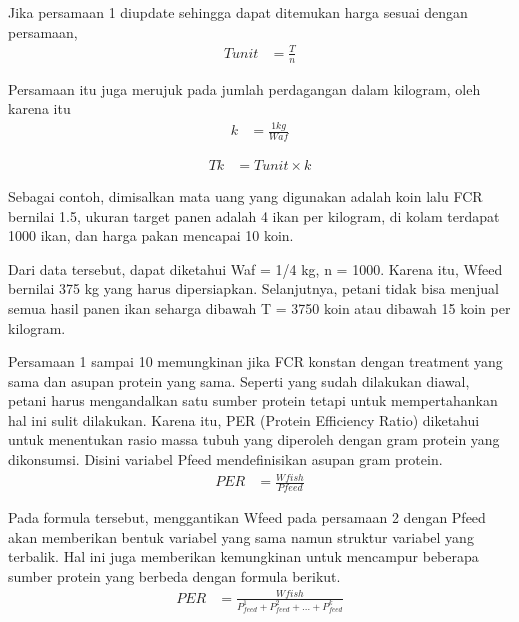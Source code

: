 Jika persamaan 1 diupdate sehingga dapat ditemukan harga sesuai dengan persamaan,
\begin{equation}
    \begin{split}
		Tunit
		&= \frac{T}{n}
    \end{split}
\end{equation}

Persamaan itu juga merujuk pada jumlah perdagangan dalam kilogram, oleh karena itu
\begin{equation}
    \begin{split}
		k
		&= \frac{1kg}{Waf}
    \end{split}
\end{equation}

\begin{equation}
    \begin{split}
		Tk
		&= Tunit \times k
    \end{split}
\end{equation}

Sebagai contoh, dimisalkan mata uang yang digunakan adalah koin lalu FCR bernilai 1.5, ukuran target panen adalah 4 ikan per kilogram, di kolam terdapat 1000 ikan, dan harga pakan mencapai 10 koin.

Dari data tersebut, dapat diketahui Waf = 1/4 kg, n = 1000. Karena itu, Wfeed bernilai 375 kg yang harus dipersiapkan. Selanjutnya, petani tidak bisa menjual semua hasil panen ikan seharga dibawah T = 3750 koin atau dibawah 15 koin per kilogram.

Persamaan 1 sampai 10 memungkinan jika FCR konstan dengan treatment yang sama dan asupan protein yang sama. Seperti yang sudah dilakukan diawal, petani harus mengandalkan satu sumber protein tetapi untuk mempertahankan hal ini sulit dilakukan. Karena itu, PER (Protein Efficiency Ratio) diketahui untuk menentukan rasio massa tubuh yang diperoleh dengan gram protein yang dikonsumsi. Disini variabel Pfeed mendefinisikan asupan gram protein.
\begin{equation}
    \begin{split}
		PER
		&= \frac{Wfish}{Pfeed}
    \end{split}
\end{equation}

Pada formula tersebut, menggantikan Wfeed pada persamaan 2 dengan Pfeed akan memberikan bentuk variabel yang sama namun struktur variabel yang terbalik. Hal ini juga memberikan kemungkinan untuk mencampur beberapa sumber protein yang berbeda dengan formula berikut.
\begin{equation}
    \begin{split}
		PER
		&= \frac{Wfish}{P^1_{feed} + P^2_{feed} + \dots + P^k_{feed}}
    \end{split}
\end{equation}

